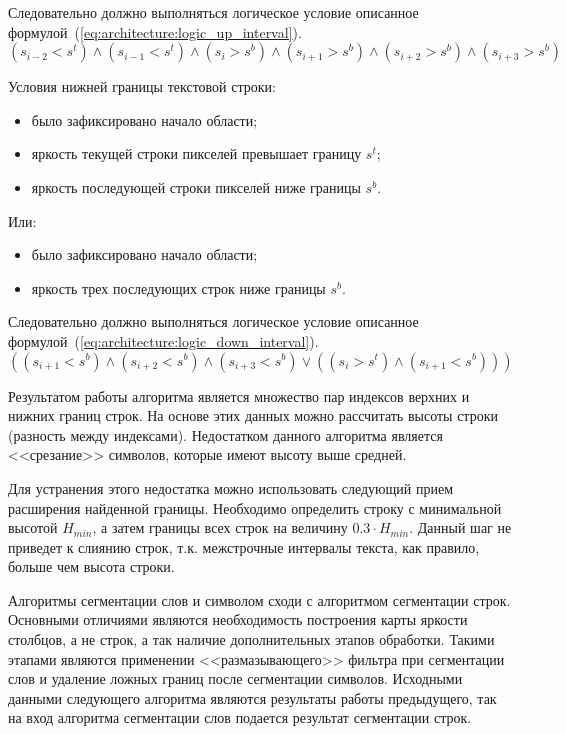 Следовательно должно выполняться логическое условие описанное формулой~(\ref{eq:architecture:logic_up_interval}).
\begin{equation}
  \label{eq:architecture:logic_up_interval}
  (s_{i-2} < s^{t}) \wedge (s_{i-1} < s^{t}) \wedge (s_i > s^{b}) \wedge (s_{i+1} > s^{b}) \wedge (s_{i+2} > s^{b}) \wedge (s_{i+3} > s^{b})
\end{equation}

Условия нижней границы текстовой строки:
\begin{itemize}     
  \item было зафиксировано начало области;
  \item яркость текущей строки пикселей превышает границу $ s^{t} $;
  \item яркость последующей строки пикселей ниже границы $ s^{b} $.
\end{itemize}
     
Или:

\begin{itemize}
   \item было зафиксировано начало области;
   \item яркость трех последующих строк ниже границы $ s^{b} $.
\end{itemize}

Следовательно должно выполняться логическое условие описанное формулой~(\ref{eq:architecture:logic_down_interval}).
\begin{equation}
  \label{eq:architecture:logic_down_interval}
  ((s_{i+1} < s^{b}) \wedge (s_{i+2} < s^{b}) \wedge (s_{i+3} < s^{b}) \vee ((s_i > s^{t}) \wedge (s_{i+1} < s^{b})))
\end{equation}

Результатом работы алгоритма является множество пар индексов верхних и нижних границ строк. На основе этих данных можно рассчитать высоты строки (разность между индексами). Недостатком данного алгоритма является <<срезание>> символов, которые имеют высоту выше средней.

Для устранения этого недостатка можно использовать следующий прием расширения найденной границы. Необходимо определить строку с минимальной высотой $ H_{min} $, а затем границы всех строк на величину $ 0.3 \cdot  H_{min} $. Данный шаг не приведет к слиянию строк, т.к. межстрочные интервалы текста, как правило, больше чем высота строки.
 
Алгоритмы сегментации слов и символом сходи с алгоритмом сегментации строк. Основными отличиями являются необходимость построения карты яркости столбцов, а не строк, а так наличие дополнительных этапов обработки. Такими этапами являются применении <<размазывающего>> фильтра при сегментации слов и удаление ложных границ после сегментации символов. Исходными данными следующего алгоритма являются результаты работы предыдущего, так на вход алгоритма сегментации слов подается результат сегментации строк.

